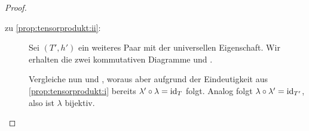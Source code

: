 \documentclass[12pt,a4paper]{scrartcl}
\theoremstyle{cplain}
\theoremstyle{cdef}
\begin{document}
\begin{proof}
\begin{description}
		\item[zu \ref{prop:tensorprodukt:ii}:] Sei $(T',h')$ ein weiteres Paar mit der universellen Eigenschaft. Wir erhalten die zwei kommutativen Diagramme  und .
		\begin{figure}[H]
			\begin{subfigure}[b]{.24\linewidth}
				\centering
				\caption{}
				\label{prop:tensorprodukt:proof:a}
			\end{subfigure}
			\begin{subfigure}[b]{.24\linewidth}
				\centering
				\caption{}
				\label{prop:tensorprodukt:proof:b}
			\end{subfigure}
			\begin{subfigure}[b]{.24\linewidth}
				\centering
				\caption{}
				\label{prop:tensorprodukt:proof:c}
			\end{subfigure}
			\begin{subfigure}[b]{.24\linewidth}
				\centering
				\caption{}
				\label{prop:tensorprodukt:proof:d}
			\end{subfigure}
		\end{figure}
		Vergleiche nun  und , woraus aber aufgrund der Eindeutigkeit aus \ref{prop:tensorprodukt:i} bereits $\lambda' \circ \lambda = \operatorname{id}_T$ folgt. Analog folgt $\lambda \circ \lambda' = \operatorname{id}_{T'}$, also ist $\lambda$ bijektiv.
		\qedhere
	\end{description}
\end{proof}
\end{document}
